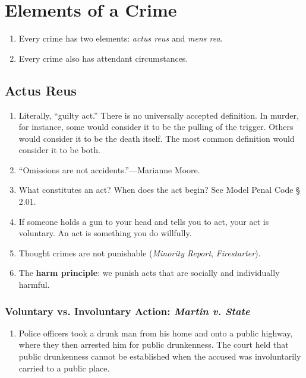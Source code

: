 \section{Elements of a Crime}

\begin{enumerate}
    \item Every crime has two elements: \emph{actus reus} and \emph{mens rea}.
    \item Every crime also has attendant circumstances.
\end{enumerate}

\subsection{Actus Reus}

\begin{enumerate}
    \item Literally, ``guilty act.'' There is no universally accepted definition. In murder, for instance, some would consider it to be the pulling of the trigger. Others would consider it to be the death itself. The most common definition would consider it to be both.
    \item ``Omissions are not accidents.''---Marianne Moore.
    \item What constitutes an act? When does the act begin? See Model Penal Code § 2.01.
    \item If someone holds a gun to your head and tells you to act, your act is voluntary. An act is something you do willfully.
    \item Thought crimes are not punishable (\emph{Minority Report}, \emph{Firestarter}).
    \item The \textbf{harm principle}: we punish acts that are socially and individually harmful.
\end{enumerate}

\subsubsection{Voluntary vs. Involuntary Action: \emph{Martin v. State}}

\begin{enumerate}
    \item Police officers took a drunk man from his home and onto a public highway, where they then arrested him for public drunkenness. The court held that public drunkenness cannot be established when the accused was involuntarily carried to a public place.
\end{enumerate}

